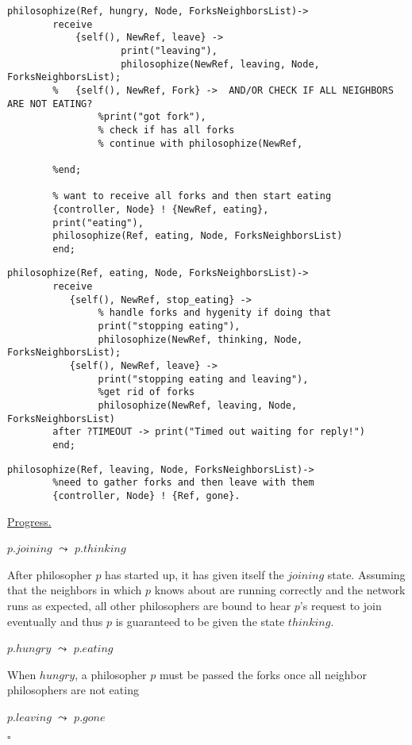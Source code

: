 \documentclass[11pt]{article}
\newenvironment{solution}{\noindent{\bf Solution.} }{

\hfill$\square$}
\begin{document}
\begin{solution}
\begin{lstlisting}
philosophize(Ref, hungry, Node, ForksNeighborsList)->
        receive
            {self(), NewRef, leave} ->
                    print("leaving"),
                    philosophize(NewRef, leaving, Node, ForksNeighborsList);
        %   {self(), NewRef, Fork} ->  AND/OR CHECK IF ALL NEIGHBORS ARE NOT EATING?
                %print("got fork"),
                % check if has all forks
                % continue with philosophize(NewRef, 

        %end;

        % want to receive all forks and then start eating
        {controller, Node} ! {NewRef, eating},
        print("eating"),
        philosophize(Ref, eating, Node, ForksNeighborsList)
        end;
\end{lstlisting}
\begin{lstlisting}
philosophize(Ref, eating, Node, ForksNeighborsList)->
        receive
           {self(), NewRef, stop_eating} ->
                % handle forks and hygenity if doing that
                print("stopping eating"),
                philosophize(NewRef, thinking, Node, ForksNeighborsList);
           {self(), NewRef, leave} ->
                print("stopping eating and leaving"),
                %get rid of forks
                philosophize(NewRef, leaving, Node, ForksNeighborsList)
        after ?TIMEOUT -> print("Timed out waiting for reply!")
        end;
\end{lstlisting}

\begin{lstlisting}
philosophize(Ref, leaving, Node, ForksNeighborsList)->
        %need to gather forks and then leave with them
        {controller, Node} ! {Ref, gone}.
\end{lstlisting}
\underline{\large{Progress.}}

$p.joining$ $\leadsto$ $p.thinking$

\indent After philosopher $p$ has started up, it has given itself the $joining$ state. Assuming that the neighbors in which $p$ knows about are running correctly and the network runs as expected, all other philosophers are bound to hear $p$'s request to join eventually and thus $p$ is guaranteed to be given the state $thinking$.

$p.hungry$ $\leadsto$ $p.eating$

\indent When $hungry$, a philosopher $p$ must be passed the forks once all neighbor philosophers are not eating

$p.leaving$ $\leadsto$ $p.gone$


\end{solution}
\end{document}
